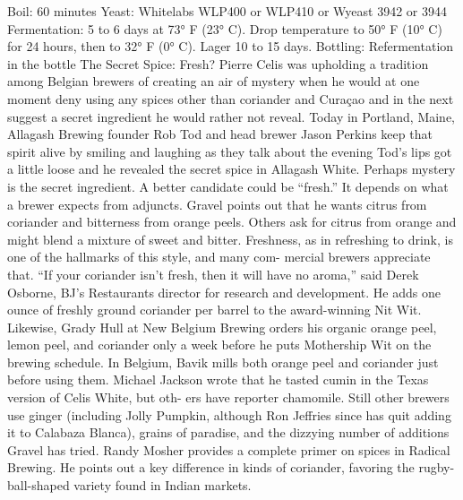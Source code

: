 \documentclass[a4paper,parskip=half]{scrartcl}
\begin{document}
Boil: 60 minutes
Yeast: Whitelabs WLP400 or WLP410 or Wyeast 3942 or 3944
Fermentation: 5 to 6 days at 73° F (23° C). Drop temperature to 50° F (10° C) for
24 hours, then to 32° F (0° C). Lager 10 to 15 days.
Bottling: Refermentation in the bottle
The Secret Spice: Fresh?
Pierre Celis was upholding a tradition among Belgian brewers of creating an air of mystery
when he would at one moment deny using any spices other than coriander and Curaçao
and in the next suggest a secret ingredient he would rather not reveal. Today in Portland,
Maine, Allagash Brewing founder Rob Tod and head brewer Jason Perkins keep that spirit
alive by smiling and laughing as they talk about the evening Tod’s lips got a little loose and
he revealed the secret spice in Allagash White.
Perhaps mystery is the secret ingredient. A better candidate could be “fresh.” It depends
on what a brewer expects from adjuncts. Gravel points out that he wants citrus from
coriander and bitterness from orange peels. Others ask for citrus from orange and might
blend a mixture of sweet and bitter.
Freshness, as in refreshing to drink, is one of the hallmarks of this style, and many com-
mercial brewers appreciate that. “If your coriander isn’t fresh, then it will have no aroma,”
said Derek Osborne, BJ’s Restaurants director for research and development. He adds one
ounce of freshly ground coriander per barrel to the award-winning Nit Wit. Likewise, Grady
Hull at New Belgium Brewing orders his organic orange peel, lemon peel, and coriander
only a week before he puts Mothership Wit on the brewing schedule. In Belgium, Bavik
mills both orange peel and coriander just before using them.
Michael Jackson wrote that he tasted cumin in the Texas version of Celis White, but oth-
ers have reporter chamomile. Still other brewers use ginger (including Jolly Pumpkin,
although Ron Jeffries since has quit adding it to Calabaza Blanca), grains of paradise, and
the dizzying number of additions Gravel has tried.
Randy Mosher provides a complete primer on spices in Radical Brewing. He points out a
key difference in kinds of coriander, favoring the rugby-ball-shaped variety found in Indian
markets.
\end{document}
